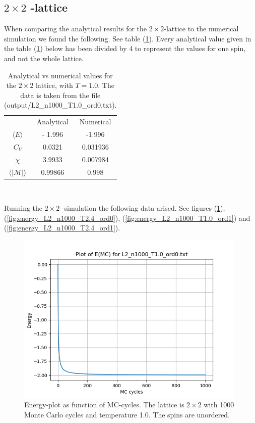 \documentclass{article}
\begin{document}
\subsection{\texorpdfstring{ $2 \times 2$ }{text}-lattice}

When comparing the analytical results for the $2 \times 2$-lattice to the numerical simulation we found the following. See table (\ref{tab:analyticalvsnumerical}). Every analytical value given in the table (\ref{tab:analyticalvsnumerical}) below has been divided by 4 to represent the values for one spin, and not the whole lattice.

\begin{table}[h]
    \centering
    \caption{ Analytical vs numerical values for the $2 \times 2$ lattice, with $T = 1.0$. The data is taken from the file (output/L2\_n1000\_T1.0\_ord0.txt). }
    \vspace{1mm}
    \label{tab:analyticalvsnumerical}
    \begin{tabular}{ c | c c | }
        \multicolumn{1}{c}{}
         & \multicolumn{1}{c}{Analytical}
         & \multicolumn{1}{c}{Numerical} \\
         \cline{2-3}
        $\langle E \rangle $ & - 1.996 & -1.996 \\
        $C_V$ & 0.0321 & 0.031936 \\
        $\chi$ & 3.9933 & 0.007984 \\
        $\langle | \mathcal{M} | \rangle $ & 0.99866 & 0.998 \\
        \cline{2-3}
    \end{tabular} \\
\end{table}

Running the $2 \times 2$ -simulation the following data arised. See figures (\ref{fig:energy_L2_n1000_T1.0_ord0}), (\ref{fig:energy_L2_n1000_T2.4_ord0}), (\ref{fig:energy_L2_n1000_T1.0_ord1}) and (\ref{fig:energy_L2_n1000_T2.4_ord1}).

  \begin{figure}[ht]
      \centering
      \includegraphics[width = 11cm]{img/energy_L2_n1000_T10_ord0.png}
      \caption{Energy-plot as function of MC-cycles. The lattice is $2 \times 2$ with 1000 Monte Carlo cycles and temperature 1.0. The spins are unordered. }
      \label{fig:energy_L2_n1000_T1.0_ord0}
    \end{figure}
\end{document}
